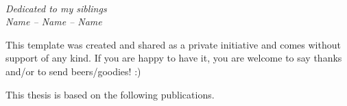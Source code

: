 \documentclass[11pt]{book}
\begin{document}


\newpage
\thispagestyle{empty} %
~
\vspace{140pt}
\begin{flushright}
  \textit{Dedicated to my siblings\\Name -- Name -- Name}
\end{flushright}

\cleardoublepage

\setcounter{page}{1} %
\setcounter{tocdepth}{1}

\tableofcontents
{}


\newpage

\thispagestyle{plain}


This template was created and shared as a private initiative and comes without
support of any kind. If you are happy to have it, you are welcome to say thanks
and/or to send beers/goodies! :)

\newpage



\thispagestyle{plain} %

This thesis is based on the following publications.


\begin{description}[leftmargin=!,labelwidth=0.7cm]
  \item[\I]  
  \item[\II] 
  \item[\III] 
  \item[\IV] 
  \item[\V] 
\end{description}
\end{document}
